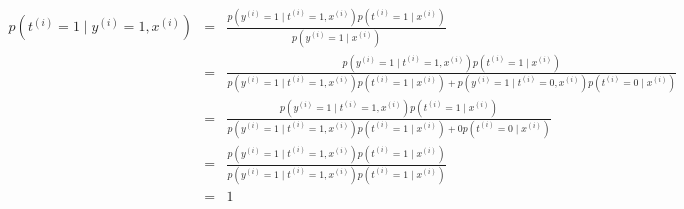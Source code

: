 \begin{answer}

\begin{eqnarray*}
p(t^{(i)}=1\mid y^{(i)} = 1, x^{(i)}) 
&=& \frac{p(y^{(i)}=1\mid t^{(i)} = 1, x^{(i)})p(t^{(i)}=1\mid x^{(i)}) }{p(y^{(i)}=1\mid x^{(i)})}\\
&=& \frac{p(y^{(i)}=1\mid t^{(i)} = 1, x^{(i)})p(t^{(i)}=1\mid x^{(i)})}{p(y^{(i)}=1\mid t^{(i)} = 1, x^{(i)})p(t^{(i)}=1\mid x^{(i)}) +p(y^{(i)}=1\mid t^{(i)} = 0, x^{(i)})p(t^{(i)}=0\mid x^{(i)}) }\\
&=& \frac{p(y^{(i)}=1\mid t^{(i)} = 1, x^{(i)})p(t^{(i)}=1\mid x^{(i)})}{p(y^{(i)}=1\mid t^{(i)} = 1, x^{(i)})p(t^{(i)}=1\mid x^{(i)}) +0p(t^{(i)}=0\mid x^{(i)}) }\\
&=& \frac{p(y^{(i)}=1\mid t^{(i)} = 1, x^{(i)})p(t^{(i)}=1\mid x^{(i)})}{p(y^{(i)}=1\mid t^{(i)} = 1, x^{(i)})p(t^{(i)}=1\mid x^{(i)})}\\
&=& 1

\end{eqnarray*}
\end{answer}

